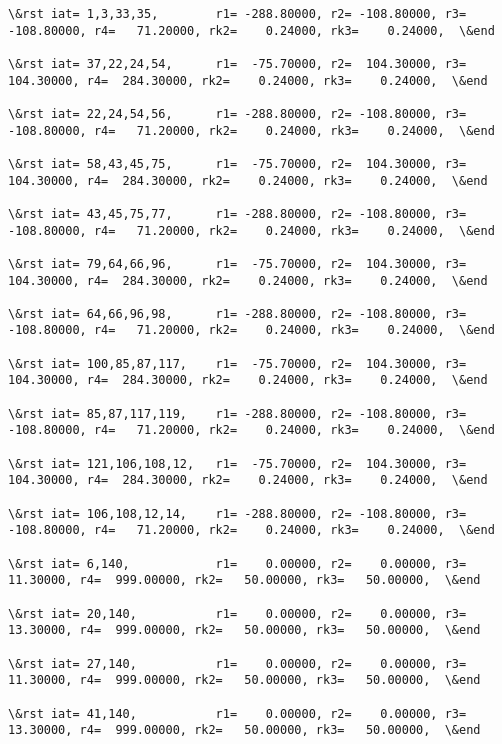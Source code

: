 \documentclass[11pt]{article}
\begin{document}
\begin{Verbatim}[commandchars=\\\{\}]
\&rst iat= 1,3,33,35,        r1= -288.80000, r2= -108.80000, r3= -108.80000, r4=   71.20000, rk2=    0.24000, rk3=    0.24000,  \&end

\&rst iat= 37,22,24,54,      r1=  -75.70000, r2=  104.30000, r3=  104.30000, r4=  284.30000, rk2=    0.24000, rk3=    0.24000,  \&end

\&rst iat= 22,24,54,56,      r1= -288.80000, r2= -108.80000, r3= -108.80000, r4=   71.20000, rk2=    0.24000, rk3=    0.24000,  \&end

\&rst iat= 58,43,45,75,      r1=  -75.70000, r2=  104.30000, r3=  104.30000, r4=  284.30000, rk2=    0.24000, rk3=    0.24000,  \&end

\&rst iat= 43,45,75,77,      r1= -288.80000, r2= -108.80000, r3= -108.80000, r4=   71.20000, rk2=    0.24000, rk3=    0.24000,  \&end

\&rst iat= 79,64,66,96,      r1=  -75.70000, r2=  104.30000, r3=  104.30000, r4=  284.30000, rk2=    0.24000, rk3=    0.24000,  \&end

\&rst iat= 64,66,96,98,      r1= -288.80000, r2= -108.80000, r3= -108.80000, r4=   71.20000, rk2=    0.24000, rk3=    0.24000,  \&end

\&rst iat= 100,85,87,117,    r1=  -75.70000, r2=  104.30000, r3=  104.30000, r4=  284.30000, rk2=    0.24000, rk3=    0.24000,  \&end

\&rst iat= 85,87,117,119,    r1= -288.80000, r2= -108.80000, r3= -108.80000, r4=   71.20000, rk2=    0.24000, rk3=    0.24000,  \&end

\&rst iat= 121,106,108,12,   r1=  -75.70000, r2=  104.30000, r3=  104.30000, r4=  284.30000, rk2=    0.24000, rk3=    0.24000,  \&end

\&rst iat= 106,108,12,14,    r1= -288.80000, r2= -108.80000, r3= -108.80000, r4=   71.20000, rk2=    0.24000, rk3=    0.24000,  \&end

\&rst iat= 6,140,            r1=    0.00000, r2=    0.00000, r3=   11.30000, r4=  999.00000, rk2=   50.00000, rk3=   50.00000,  \&end

\&rst iat= 20,140,           r1=    0.00000, r2=    0.00000, r3=   13.30000, r4=  999.00000, rk2=   50.00000, rk3=   50.00000,  \&end

\&rst iat= 27,140,           r1=    0.00000, r2=    0.00000, r3=   11.30000, r4=  999.00000, rk2=   50.00000, rk3=   50.00000,  \&end

\&rst iat= 41,140,           r1=    0.00000, r2=    0.00000, r3=   13.30000, r4=  999.00000, rk2=   50.00000, rk3=   50.00000,  \&end


\end{Verbatim}
\end{document}
